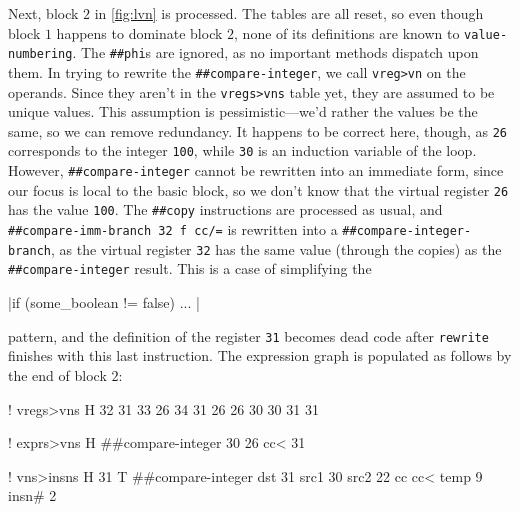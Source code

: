 Next, block $2$ in \vref{fig:lvn} is processed.  The tables are all reset, so
even though block $1$ happens to dominate block $2$, none of its definitions
are known to \Verb|value-numbering|.  The \Verb|##phi|s are ignored, as no
important methods dispatch upon them.  In trying to rewrite the
\Verb|##compare-integer|, we call \Verb|vreg>vn| on the operands.  Since they
aren't in the \Verb|vregs>vns| table yet, they are assumed to be unique values.
This assumption is pessimistic---we'd rather the values be the same, so we can
remove redundancy.  It happens to be correct here, though, as \Verb|26|
corresponds to the integer \Verb|100|, while \Verb|30| is an induction variable
of the loop.  However, \Verb|##compare-integer| cannot be rewritten into an
immediate form, since our focus is local to the basic block, so we don't know
that the virtual register \Verb|26| has the value \Verb|100|.  The
\Verb|##copy| instructions are processed as usual, and
%
\Verb|##compare-imm-branch 32 f cc/=|
%
is rewritten into a \Verb|##compare-integer-branch|, as the virtual register
\Verb|32| has the same value (through the copies) as the
\Verb|##compare-integer| result.  This is a case of simplifying the 
%
\begin{center} |if (some_boolean != false) { ... }| \end{center}
%
pattern, and the definition of the register \Verb|31| becomes dead code after
\Verb|rewrite| finishes with this last instruction.  The expression graph is
populated as follows by the end of block $2$:
%
  \begin{factorcode}
    ! vregs>vns
    H{
        { 32 31 }
        { 33 26 }
        { 34 31 }
        { 26 26 }
        { 30 30 }
        { 31 31 }
    }

    ! exprs>vns
    H{ { { ##compare-integer 30 26 cc< } 31 } }

    ! vns>insns
    H{
        {
            31
            T{ ##compare-integer
                { dst 31 }
                { src1 30 }
                { src2 22 }
                { cc cc< }
                { temp 9 }
                { insn# 2 }
            }
        }
    }
  \end{factorcode}

